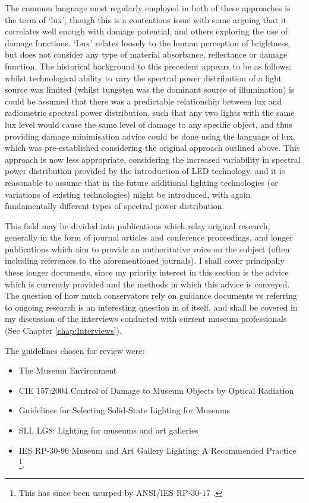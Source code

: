 The common language most regularly employed in both of these approaches is the term of `lux', though this is a contentious issue with some arguing that it correlates well enough with damage potential, and others exploring the use of damage functions. `Lux' relates loosely to the human perception of brightness, but does not consider any type of material absorbance, reflectance or damage function. The historical background to this precedent appears to be as follows; whilst technological ability to vary the spectral power distribution of a light source was limited (whilst tungsten was the dominant source of illumination) is could be assumed that there was a predictable relationship between lux and radiometric spectral power distribution, such that any two lights with the same lux level would cause the same level of damage to any specific object, and thus providing damage minimisation advice could be done using the language of lux, which was pre-established considering the original approach outlined above. This approach is now less appropriate, considering the increased variability in spectral power distribution provided by the introduction of LED technology, and it is reasonable to assume that in the future additional lighting technologies (or variations of existing technologies) might be introduced, with again fundamentally different types of spectral power distribution.

This field may be divided into publications which relay original research, generally in the form of journal articles and conference proceedings, and longer publications which aim to provide an authoritative voice on the subject (often including references to the aforementioned journals). I shall cover principally these longer documents, since my priority interest in this section is the advice which is currently provided and the methods in which this advice is conveyed. The question of how much conservators rely on guidance documents vs referring to ongoing research is an interesting question in of itself, and shall be covered in my discussion of the interviews conducted with current museum professionals (See Chapter \ref{chap:Interviews}).

\noindent
The guidelines chosen for review were:
\begin{itemize}
\item The Museum Environment \citep{thomson_museum_1986}
\item \gls{CIE} 157:2004 Control of Damage to Museum Objects by Optical Radiation \citep{cie_cie_2004}
\item Guidelines for Selecting Solid-State Lighting for Museums \citep{druzik_guidelines_2012}
\item SLL LG8: Lighting for museums and art galleries \citep{cibse_lighting_2015}
\item IES RP-30-96 Museum and Art Gallery Lighting: A Recommended Practice \citep{ies_ies_1996}\footnote{This has since been usurped by ANSI/IES RP-30-17 \citep{ies_ansi/ies_2017}.}.
\end{itemize}

